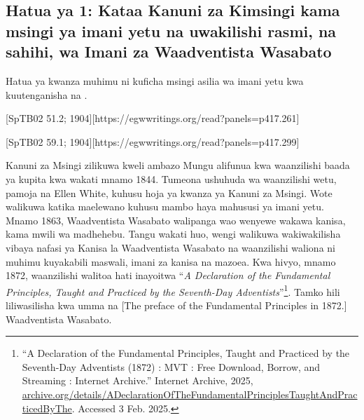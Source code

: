 \subsection*{Hatua ya 1: Kataa Kanuni za Kimsingi kama msingi ya imani yetu na uwakilishi rasmi, na sahihi, wa Imani za Waadventista Wasabato}


Hatua ya kwanza muhimu ni kuficha msingi asilia wa imani yetu kwa kuutenganisha na .


[SpTB02 51.2; 1904][https://egwwritings.org/read?panels=p417.261]


[SpTB02 59.1; 1904][https://egwwritings.org/read?panels=p417.299]


Kanuni za Msingi zilikuwa kweli ambazo Mungu alifunua kwa waanzilishi baada ya kupita kwa wakati mnamo 1844. Tumeona ushuhuda wa waanzilishi wetu, pamoja na Ellen White, kuhusu hoja ya kwanza ya Kanuni za Msingi. Wote walikuwa katika maelewano kuhusu mambo haya mahususi ya imani yetu. Mnamo 1863, Waadventista Wasabato walipanga wao wenyewe wakawa kanisa, kama mwili wa madhehebu. Tangu wakati huo, wengi walikuwa wakiwakilisha vibaya nafasi ya Kanisa la Waadventista Wasabato na waanzilishi waliona ni muhimu kuyakabili maswali,  imani za kanisa na mazoea. Kwa hivyo, mnamo 1872, waanzilishi walitoa hati inayoitwa “\textit{A Declaration of the Fundamental Principles, Taught and Practiced by the Seventh-Day Adventists}”\footnote{“A Declaration of the Fundamental Principles, Taught and Practiced by the Seventh-Day Adventists (1872) : MVT : Free Download, Borrow, and Streaming : Internet Archive.” Internet Archive, 2025, \href{https://archive.org/details/ADeclarationOfTheFundamentalPrinciplesTaughtAndPracticedByThe}{archive.org/details/ADeclarationOfTheFundamentalPrinciplesTaughtAndPracticedByThe}. Accessed 3 Feb. 2025.}. Tamko hili liliwasilisha kwa umma na [The preface of the Fundamental Principles in 1872.] Waadventista Wasabato.


